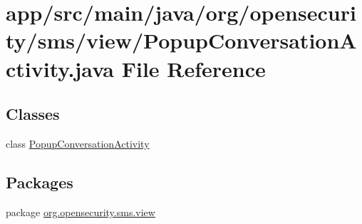 \hypertarget{a00032}{\section{app/src/main/java/org/opensecurity/sms/view/\+Popup\+Conversation\+Activity.java File Reference}
\label{a00032}
}
\subsection*{Classes}
\begin{DoxyCompactItemize}
\item 
class \hyperlink{a00013}{Popup\+Conversation\+Activity}
\end{DoxyCompactItemize}
\subsection*{Packages}
\begin{DoxyCompactItemize}
\item 
package \hyperlink{a00041}{org.\+opensecurity.\+sms.\+view}
\end{DoxyCompactItemize}
